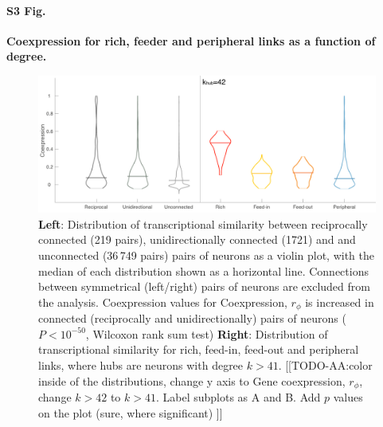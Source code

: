 \documentclass[10pt,letterpaper]{article}
\begin{document}
\paragraph*{S3 Fig.}
{\bf Coexpression for rich, feeder and peripheral links as a function of degree.}
\begin{figure}[!h]
\label{S3_Fig}
\centering
    \includegraphics[width=1\textwidth]{Distributions.pdf}
    \caption{
\textbf{Left}: Distribution of transcriptional similarity between reciprocally connected (219 pairs), unidirectionally connected (1721) and  and unconnected (36\,749 pairs) pairs of neurons as a violin plot, with the median of each distribution shown as a horizontal line.
Connections between symmetrical (left/right) pairs of neurons are excluded from the analysis. Coexpression values for 
Coexpression, $r_\phi$ is increased in connected (reciprocally and unidirectionally) pairs of neurons ($P < 10^{-50}$, Wilcoxon rank sum test)
\textbf{Right}: Distribution of transcriptional similarity for rich, feed-in, feed-out and peripheral links, where hubs are neurons with degree $k>41$.
[[TODO-AA:color inside of the distributions, change y axis to Gene coexpression, $r_\phi$, change $k>42$ to $k>41$.
Label subplots as A and B.
Add $p$ values on the plot (sure, where significant)
]]
}
\end{figure}

\end{document}
